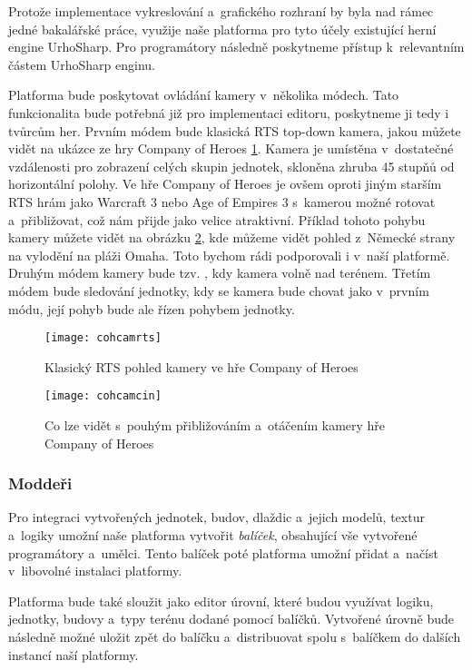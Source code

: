 Protože implementace vykreslování a~grafického rozhraní by byla nad rámec jedné bakalářské práce, využije naše platforma pro tyto účely existující herní engine UrhoSharp. Pro programátory následně  poskytneme přístup k~relevantním částem UrhoSharp enginu.

Platforma bude poskytovat ovládání kamery v~několika módech. Tato funkcionalita bude potřebná již pro implementaci editoru, poskytneme ji tedy i tvůrcům her. Prvním módem bude klasická RTS top-down kamera, jakou můžete vidět na ukázce ze hry Company of Heroes \ref{fig:cohcamrts}. Kamera je umístěna v~dostatečné vzdálenosti pro zobrazení celých skupin jednotek, skloněna zhruba 45 stupňů od horizontální polohy.  Ve hře Company of Heroes je ovšem oproti jiným starším RTS hrám jako Warcraft 3 nebo Age of Empires 3 s~kamerou možné rotovat a~přibližovat, což nám přijde jako velice atraktivní. Příklad tohoto pohybu kamery můžete vidět na obrázku \ref{fig:cohcamcin}, kde můžeme vidět pohled z~Německé strany na vylodění na pláži Omaha. Toto bychom rádi podporovali i v~naší platformě. Druhým módem kamery bude tzv.  , kdy kamera volně   nad terénem. Třetím módem bude sledování jednotky, kdy se kamera bude chovat jako v~prvním módu, její pohyb bude ale řízen pohybem jednotky.

\begin{figure}[h]	
	\centering
	\texttt{[image: cohcamrts]}
	\caption{Klasický RTS pohled kamery ve hře Company of Heroes}
	\label{fig:cohcamrts}
\end{figure}

\begin{figure}[h]	
	\centering
	\texttt{[image: cohcamcin]}
	\caption{Co lze vidět s~pouhým přibližováním a~otáčením kamery hře Company of Heroes}
	\label{fig:cohcamcin}
\end{figure}

\subsubsection{Moddeři}

Pro integraci vytvořených jednotek, budov, dlaždic a~jejich modelů, textur a~logiky umožní naše platforma vytvořit \emph{balíček}, obsahující vše vytvořené programátory a~umělci.  Tento balíček poté platforma umožní přidat a~načíst v~libovolné instalaci platformy.

Platforma bude také sloužit jako editor úrovní, které budou využívat logiku, jednotky, budovy a~typy terénu dodané pomocí balíčků. Vytvořené úrovně bude následně možné uložit zpět do balíčku a~distribuovat spolu s~balíčkem do dalších instancí naší platformy.

